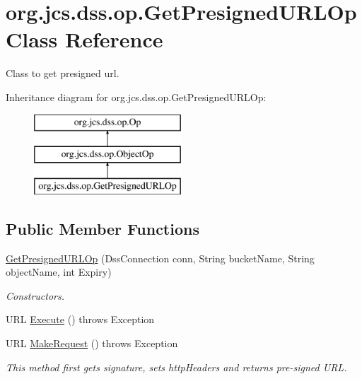 \hypertarget{classorg_1_1jcs_1_1dss_1_1op_1_1GetPresignedURLOp}{}\section{org.\+jcs.\+dss.\+op.\+Get\+Presigned\+U\+R\+L\+Op Class Reference}
\label{classorg_1_1jcs_1_1dss_1_1op_1_1GetPresignedURLOp}


Class to get presigned url.  


Inheritance diagram for org.\+jcs.\+dss.\+op.\+Get\+Presigned\+U\+R\+L\+Op\+:\begin{figure}[H]
\begin{center}
\leavevmode
\includegraphics[height=3.000000cm]{classorg_1_1jcs_1_1dss_1_1op_1_1GetPresignedURLOp}
\end{center}
\end{figure}
\subsection*{Public Member Functions}
\begin{DoxyCompactItemize}
\item 
\hyperlink{classorg_1_1jcs_1_1dss_1_1op_1_1GetPresignedURLOp_a6e64e303788d28cfa3fb680eae98c761}{Get\+Presigned\+U\+R\+L\+Op} (Dss\+Connection conn, String bucket\+Name, String object\+Name, int Expiry)\hypertarget{classorg_1_1jcs_1_1dss_1_1op_1_1GetPresignedURLOp_a6e64e303788d28cfa3fb680eae98c761}{}\label{classorg_1_1jcs_1_1dss_1_1op_1_1GetPresignedURLOp_a6e64e303788d28cfa3fb680eae98c761}

\begin{DoxyCompactList}\small\item\em Constructors. \end{DoxyCompactList}\item 
U\+RL \hyperlink{classorg_1_1jcs_1_1dss_1_1op_1_1GetPresignedURLOp_a7a53d9a226d5f47838850d3f989635b2}{Execute} ()  throws Exception 
\item 
U\+RL \hyperlink{classorg_1_1jcs_1_1dss_1_1op_1_1GetPresignedURLOp_a5e66c5007ee4990fd4a1a9b345336b3b}{Make\+Request} ()  throws Exception 
\begin{DoxyCompactList}\small\item\em This method first gets signature, sets http\+Headers and returns pre-\/signed U\+RL. \end{DoxyCompactList}\end{DoxyCompactItemize}
